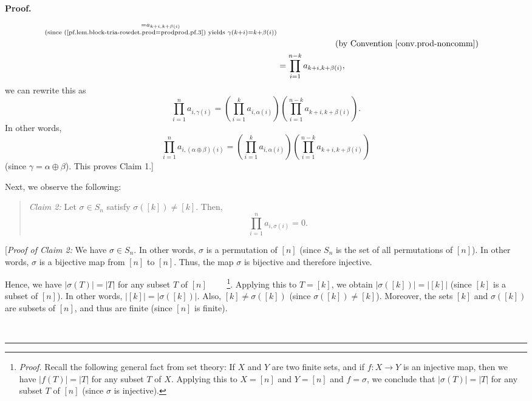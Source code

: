 \documentclass
[numbers=enddot,12pt,final,onecolumn,notitlepage,english]{scrartcl}%
\theoremstyle{definition}
\newenvironment{statement}{\begin{quote}}{\end{quote}}
\newenvironment{proof}[1][Proof]{\noindent\textbf{#1.} }{\ \rule{0.5em}{0.5em}}
\let\prodnonlimits\prod
\renewcommand{\prod}{\prodnonlimits\limits}
\newenvironment{verlong}{}{}
\begin{document}
\begin{verlong}
\begin{proof}
\begin{align*}
{}_{\substack{=a_{k+i,k+\beta\left(  i\right)  }\\\text{(since
(\ref{pf.lem.block-tria-rowdet.prod=prodprod.pf.3}) yields }\gamma\left(
k+i\right)  =k+\beta\left(  i\right)  \text{)}}}\\
&  \ \ \ \ \ \ \ \ \ \ \ \ \ \ \ \ \ \ \ \ \left(  \text{by Convention
\ref{conv.prod-noncomm}}\right) \\
&  =\prod_{i=1}^{n-k}a_{k+i,k+\beta\left(  i\right)  },
\end{align*}
we can rewrite this as
\[
\prod_{i=1}^{n}a_{i,\gamma\left(  i\right)  }=\left(  \prod_{i=1}%
^{k}a_{i,\alpha\left(  i\right)  }\right)  \left(  \prod_{i=1}^{n-k}%
a_{k+i,k+\beta\left(  i\right)  }\right)  .
\]
In other words,%
\[
\prod_{i=1}^{n}a_{i,\left(  \alpha\oplus\beta\right)  \left(  i\right)
}=\left(  \prod_{i=1}^{k}a_{i,\alpha\left(  i\right)  }\right)  \left(
\prod_{i=1}^{n-k}a_{k+i,k+\beta\left(  i\right)  }\right)
\]
(since $\gamma=\alpha\oplus\beta$). This proves Claim 1.] \medskip

Next, we observe the following:

\begin{statement}
\textit{Claim 2:} Let $\sigma\in S_{n}$ satisfy $\sigma\left(  \left[
k\right]  \right)  \neq\left[  k\right]  $. Then,
\[
\prod_{i=1}^{n}a_{i,\sigma\left(  i\right)  }=0.
\]

\end{statement}

[\textit{Proof of Claim 2:} We have $\sigma\in S_{n}$. In other words,
$\sigma$ is a permutation of $\left[  n\right]  $ (since $S_{n}$ is the set of
all permutations of $\left[  n\right]  $). In other words, $\sigma$ is a
bijective map from $\left[  n\right]  $ to $\left[  n\right]  $. Thus, the map
$\sigma$ is bijective and therefore injective.

Hence, we have $\left\vert \sigma\left(  T\right)  \right\vert =\left\vert
T\right\vert $ for any subset $T$ of $\left[  n\right]  $%
\ \ \ \ \footnote{\textit{Proof.} Recall the following general fact from set
theory: If $X$ and $Y$ are two finite sets, and if $f:X\rightarrow Y$ is an
injective map, then we have $\left\vert f\left(  T\right)  \right\vert
=\left\vert T\right\vert $ for any subset $T$ of $X$. Applying this to
$X=\left[  n\right]  $ and $Y=\left[  n\right]  $ and $f=\sigma$, we conclude
that $\left\vert \sigma\left(  T\right)  \right\vert =\left\vert T\right\vert
$ for any subset $T$ of $\left[  n\right]  $ (since $\sigma$ is injective).}.
Applying this to $T=\left[  k\right]  $, we obtain $\left\vert \sigma\left(
\left[  k\right]  \right)  \right\vert =\left\vert \left[  k\right]
\right\vert $ (since $\left[  k\right]  $ is a subset of $\left[  n\right]
$). In other words, $\left\vert \left[  k\right]  \right\vert =\left\vert
\sigma\left(  \left[  k\right]  \right)  \right\vert $. Also, $\left[
k\right]  \neq\sigma\left(  \left[  k\right]  \right)  $ (since $\sigma\left(
\left[  k\right]  \right)  \neq\left[  k\right]  $). Moreover, the sets
$\left[  k\right]  $ and $\sigma\left(  \left[  k\right]  \right)  $ are
subsets of $\left[  n\right]  $, and thus are finite (since $\left[  n\right]
$ is finite).


\end{proof}
\end{verlong}
\end{document}
